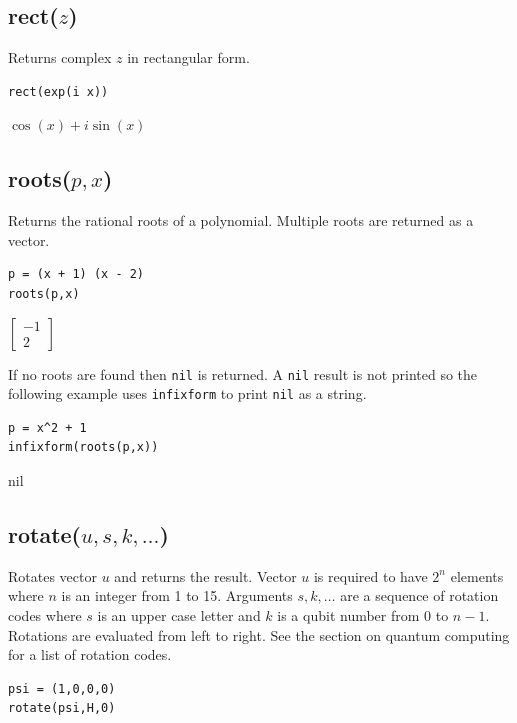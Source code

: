 \documentclass[12pt]{article}
\begin{document}
\subsection*{rect($z$)}

Returns complex $z$ in rectangular form.

{\color{blue}
\begin{verbatim}
rect(exp(i x))
\end{verbatim}
}

\noindent
$\displaystyle \cos(x)+i\sin(x)$

\subsection*{roots($p,x$)}

Returns the rational roots of a polynomial.
Multiple roots are returned as a vector.

{\color{blue}
\begin{verbatim}
p = (x + 1) (x - 2)
roots(p,x)
\end{verbatim}
}

\noindent
$\displaystyle
\begin{bmatrix}
-1
\\[1ex]
2
\end{bmatrix}
$

\bigskip
\noindent
If no roots are found then \verb$nil$ is returned.
A \verb$nil$ result is not printed so the following example uses
\verb$infixform$ to print \verb$nil$ as a string.

{\color{blue}
\begin{verbatim}
p = x^2 + 1
infixform(roots(p,x))
\end{verbatim}
}

\noindent
nil

\subsection*{rotate($u,s,k,\ldots$)}
Rotates vector $u$ and returns the result.
Vector $u$ is required to have $2^n$ elements where
$n$ is an integer from 1 to 15.
Arguments $s,k,\ldots$ are a sequence of rotation codes
where $s$ is an upper case letter and $k$ is a qubit number
from 0 to $n-1$.
Rotations are evaluated from left to right.
See the section on quantum computing for a list of rotation codes.

{\color{blue}
\begin{verbatim}
psi = (1,0,0,0)
rotate(psi,H,0)
\end{verbatim}
}
\end{document}
